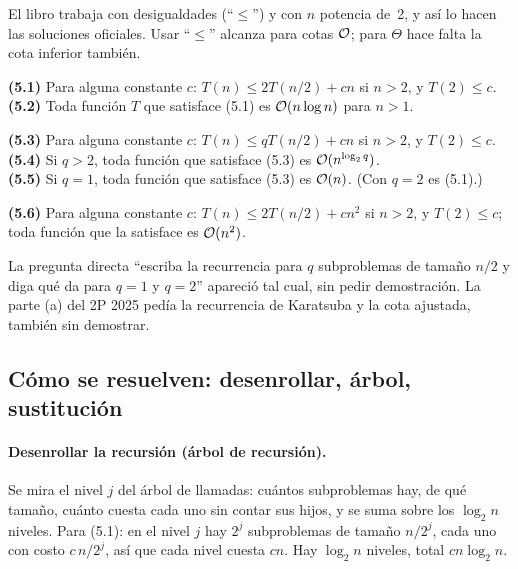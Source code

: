 El libro trabaja con desigualdades (``$\le$'') y con $n$ potencia de~2, y así lo hacen las soluciones oficiales. Usar ``$\le$'' alcanza para cotas $\mathcal{O}$; para $\Theta$ hace falta la cota inferior también.

\begin{resultado}
\textbf{(5.1)} Para alguna constante $c$: $T(n)\le 2T(n/2)+cn$ si $n>2$, y $T(2)\le c$.\\
\textbf{(5.2)} Toda función $T$ que satisface (5.1) es $\mathcal{O}(n\log n)$ para $n>1$.

\smallskip
\textbf{(5.3)} Para alguna constante $c$: $T(n)\le qT(n/2)+cn$ si $n>2$, y $T(2)\le c$.\\
\textbf{(5.4)} Si $q>2$, toda función que satisface (5.3) es $\mathcal{O}(n^{\log_2 q})$.\\
\textbf{(5.5)} Si $q=1$, toda función que satisface (5.3) es $\mathcal{O}(n)$. (Con $q=2$ es (5.1).)

\smallskip
\textbf{(5.6)} Para alguna constante $c$: $T(n)\le 2T(n/2)+cn^2$ si $n>2$, y $T(2)\le c$; toda función que la satisface es $\mathcal{O}(n^2)$.
\end{resultado}

La pregunta directa ``escriba la recurrencia para $q$ subproblemas de tamaño $n/2$ y diga qué da para $q=1$ y $q=2$'' apareció tal cual, sin pedir demostración. La parte (a) del 2P 2025 pedía la recurrencia de Karatsuba y la cota ajustada, también sin demostrar.

\subsection{Cómo se resuelven: desenrollar, árbol, sustitución}

\paragraph{Desenrollar la recursión (árbol de recursión).} Se mira el nivel $j$ del árbol de llamadas: cuántos subproblemas hay, de qué tamaño, cuánto cuesta cada uno sin contar sus hijos, y se suma sobre los $\log_2 n$ niveles. Para (5.1): en el nivel $j$ hay $2^j$ subproblemas de tamaño $n/2^j$, cada uno con costo $c\,n/2^j$, así que cada nivel cuesta $cn$. Hay $\log_2 n$ niveles, total $cn\log_2 n$.

